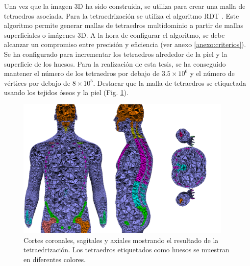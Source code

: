 Una vez que la imagen 3D ha sido construida, se utiliza para crear una malla de tetraedros asociada. Para la tetraedrización se utiliza el algoritmo \ac{RDT} \cite{jamin:hal-00796052}. Este algoritmo permite generar mallas de tetraedros multidominio a partir de mallas superficiales o imágenes 3D. A la hora de configurar el algoritmo, se debe alcanzar un compromiso entre precisión y eficiencia (ver anexo \ref{anexo:criterios}). Se ha configurado para incrementar los tetraedros alrededor de la piel y la superficie de los huesos. Para la realización de esta tesis, se ha conseguido mantener el número de los tetraedros por debajo de $3.5\times 10^6$ y el número de vértices por debajo de $8 \times 10^5$. Destacar que la malla de tetraedros se etiquetada usando los tejidos óseos y la piel (Fig. \ref{fig:tetra}).
%
\begin{figure}[th]
   \centering
    \includegraphics[width=0.95\textwidth]{IMG/boneid.png}
     \caption{Cortes coronales, sagitales y axiales mostrando el resultado de la tetraedrización. Los tetraedros etiquetados como huesos se muestran en diferentes colores.}
\label{fig:tetra}
\end{figure} 


